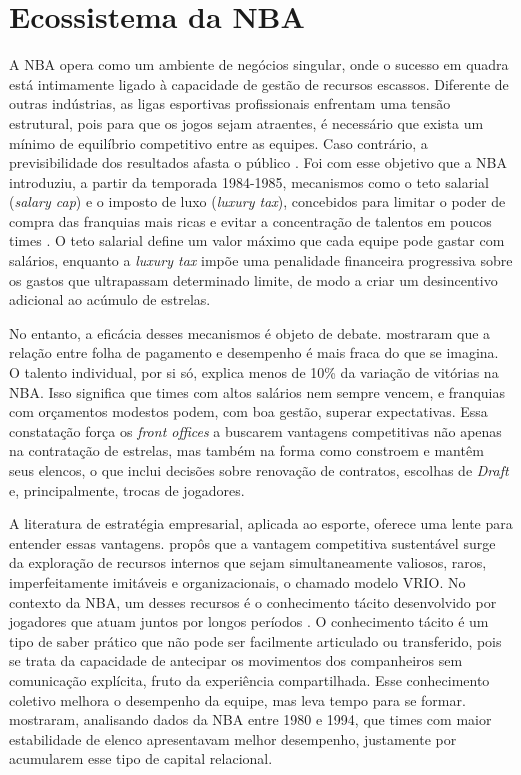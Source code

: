 \section{Ecossistema da NBA}
\label{sec:nba_ecosystem}

A NBA opera como um ambiente de negócios singular, onde o sucesso em quadra está intimamente ligado à capacidade de gestão de recursos escassos. Diferente de outras indústrias, as ligas esportivas profissionais enfrentam uma tensão estrutural, pois para que os jogos sejam atraentes, é necessário que exista um mínimo de equilíbrio competitivo entre as equipes. Caso contrário, a previsibilidade dos resultados afasta o público \citep{rottenberg1956, neale1964}. Foi com esse objetivo que a NBA introduziu, a partir da temporada 1984-1985, mecanismos como o teto salarial (\textit{salary cap}) e o imposto de luxo (\textit{luxury tax}), concebidos para limitar o poder de compra das franquias mais ricas e evitar a concentração de talentos em poucos times \citep{fort1995, kesenne2000}. O teto salarial define um valor máximo que cada equipe pode gastar com salários, enquanto a \textit{luxury tax} impõe uma penalidade financeira progressiva sobre os gastos que ultrapassam determinado limite, de modo a criar um desincentivo adicional ao acúmulo de estrelas.

No entanto, a eficácia desses mecanismos é objeto de debate. \citet{berrischmidt2010} mostraram que a relação entre folha de pagamento e desempenho é mais fraca do que se imagina. O talento individual, por si só, explica menos de 10\% da variação de vitórias na NBA. Isso significa que times com altos salários nem sempre vencem, e franquias com orçamentos modestos podem, com boa gestão, superar expectativas. Essa constatação força os \textit{front offices} a buscarem vantagens competitivas não apenas na contratação de estrelas, mas também na forma como constroem e mantêm seus elencos, o que inclui decisões sobre renovação de contratos, escolhas de \textit{Draft} e, principalmente, trocas de jogadores.

A literatura de estratégia empresarial, aplicada ao esporte, oferece uma lente para entender essas vantagens. \citet{barney1991} propôs que a vantagem competitiva sustentável surge da exploração de recursos internos que sejam simultaneamente valiosos, raros, imperfeitamente imitáveis e organizacionais, o chamado modelo VRIO. No contexto da NBA, um desses recursos é o conhecimento tácito desenvolvido por jogadores que atuam juntos por longos períodos \citep{berman2002}. O conhecimento tácito é um tipo de saber prático que não pode ser facilmente articulado ou transferido, pois se trata da capacidade de antecipar os movimentos dos companheiros sem comunicação explícita, fruto da experiência compartilhada. Esse conhecimento coletivo melhora o desempenho da equipe, mas leva tempo para se formar. \citet{berman2002} mostraram, analisando dados da NBA entre 1980 e 1994, que times com maior estabilidade de elenco apresentavam melhor desempenho, justamente por acumularem esse tipo de capital relacional.

